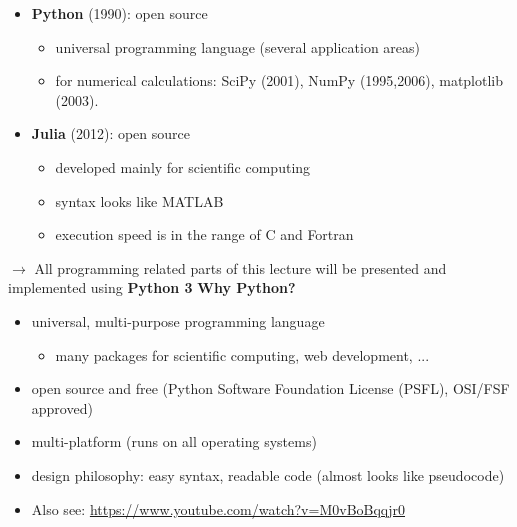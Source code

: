 \begin{frame}[c]
\begin{itemize}
	
	\item
	\textbf{Python} (1990): open source
	
	\begin{itemize}
		
		\item
		universal programming language (several application areas)
		\item
		for numerical calculations: SciPy (2001), NumPy (1995,2006),
		matplotlib (2003).
	\end{itemize}
\end{itemize}

\begin{itemize}
	
	\item
	\textbf{Julia} (2012): open source
	
	\begin{itemize}
		
		\item
		developed mainly for scientific computing
		\item
		syntax looks like MATLAB
		\item
		execution speed is in the range of C and Fortran
	\end{itemize}
\end{itemize}
\end{frame}

\begin{frame}[c]
$\rightarrow$ All programming related parts of this lecture will be presented and implemented using \textbf{Python 3}
\Vspace{1cm}
\textbf{Why Python?}
\Vspace{0.5cm}
\begin{itemize}	
	\item
	universal, multi-purpose programming language	
	\begin{itemize}		
		\item
		many packages for scientific computing, web development, ...
	\end{itemize}
	\item
	open source and free (Python Software Foundation License (PSFL), OSI/FSF approved)
	\item
	multi-platform (runs on all operating systems)
	\item
	design philosophy: easy syntax, readable code (almost looks like
	pseudocode)
	\item Also see: \url{https://www.youtube.com/watch?v=M0vBoBqqjr0}
\end{itemize}
\end{frame}

